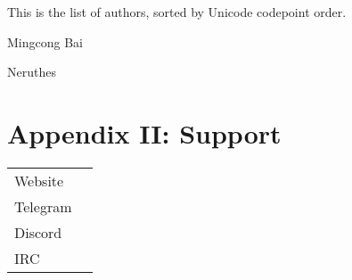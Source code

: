 \documentclass[a5paper,twosided,11pt]{book}
\begin{document}

    \vspace{1ex}This is the list of authors, sorted by Unicode codepoint order.

    \begin{tcolorbox}[colframe=black,colback=white]
        \begin{compactitem}
            \item Mingcong Bai
            \item Neruthes
        \end{compactitem}
    \end{tcolorbox}

    \section{Appendix II: Support}

    \begin{tabu} {lX}
        Website &  \\
        Telegram &  \\
        Discord &  \\
        IRC &  \\
    \end{tabu}






\end{document}
